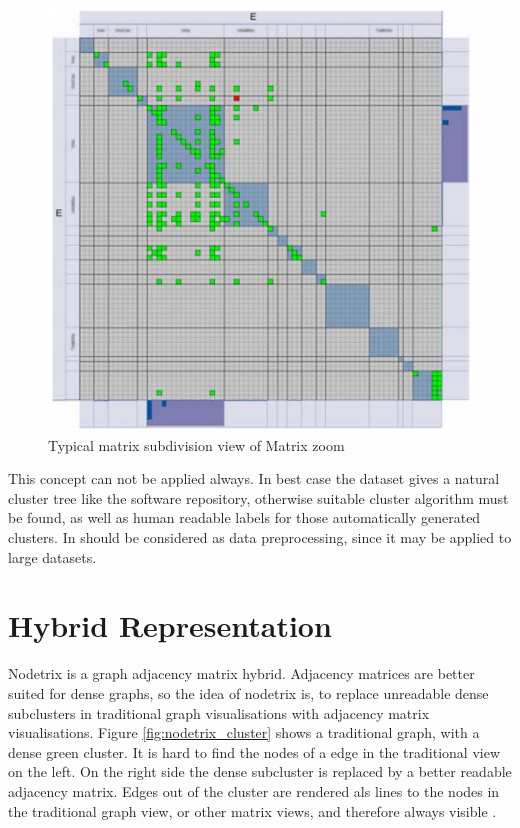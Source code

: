 \begin{figure}[h]
\centering
\includegraphics[width=\textwidth/2]{images/matrixzoom_cluster}
\caption{Typical matrix subdivision view of Matrix zoom\citep{ham_phd} \label{fig:matrixzoom_cluster}}
\end{figure}

This concept can not be applied always. In best case the dataset gives a natural cluster tree like the software repository, otherwise suitable cluster algorithm must be found, as well as human readable labels for those automatically generated clusters. In should be considered as data preprocessing, since it may be applied to large datasets.













\section{Hybrid Representation}
Nodetrix is a graph adjacency matrix hybrid. Adjacency matrices are better suited for dense graphs, so the idea of nodetrix is, to replace unreadable dense subclusters in traditional graph visualisations with adjacency matrix visualisations. Figure \ref{fig:nodetrix_cluster} shows a traditional graph, with a dense green cluster. It is hard to find the nodes of a edge in the traditional view on the left. On the right side the dense subcluster is replaced by a better readable  adjacency matrix. Edges out of the cluster are rendered als lines to the nodes in the traditional graph view, or other matrix views, and therefore always visible \citep{henry-nodetrix-2007}.



